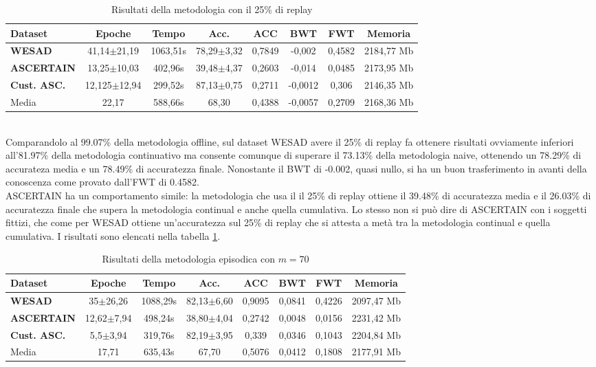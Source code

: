 \begin{table}[h]
\footnotesize
    \begin{tabular}{l|c|c|c|c|c|c|c}
        \textbf{Dataset} & \textbf{Epoche} & \textbf{Tempo} & \textbf{Acc.} & \textbf{ACC} & \textbf{BWT} & \textbf{FWT} & \textbf{Memoria}\\
        \hline
        \textbf{WESAD} & 41,14$\pm$21,19 & 1063,51s & 78,29$\pm$3,32 & 0,7849 & -0,002 & 0,4582 & 2184,77 Mb\\
        \textbf{ASCERTAIN} & 13,25$\pm$10,03 & 402,96s & 39,48$\pm$4,37 & 0,2603 & -0,014 & 0,0485 & 2173,95 Mb\\
        \textbf{Cust. ASC.} & 12,125$\pm$12,94 & 299,52s & 87,13$\pm$0,75 & 0,2711 & -0,0012 & 0,306 & 2146,35 Mb\\
        \hline
        Media & 22,17 & 588,66s & 68,30 & 0,4388 & -0,0057 & 0,2709 & 2168,36 Mb
    \end{tabular}
    \caption{Risultati della metodologia con il 25\% di replay}
    \label{tab:resreplay}
\end{table}\\
Comparandolo al 99.07\% della metodologia offline, sul dataset WESAD avere il 25\% di replay fa ottenere risultati ovviamente inferiori all'81.97\% della metodologia continuativo ma consente comunque di superare il 73.13\% della metodologia naive, ottenendo un 78.29\% di accurateza media e un 78.49\% di accuratezza finale. Nonostante il BWT di -0.002, quasi nullo, si ha un buon trasferimento in avanti della conoscenza come provato dall'FWT di 0.4582.\\
ASCERTAIN ha un comportamento simile: la metodologia che usa il il 25\% di replay ottiene il 39.48\% di accuratezza media e il 26.03\% di accuratezza finale che supera la metodologia continual e anche quella cumulativa. Lo stesso non si può dire di ASCERTAIN con i soggetti fittizi, che come per WESAD ottiene un'accuratezza sul 25\% di replay che si attesta a metà tra la metodologia continual e quella cumulativa. I risultati sono elencati nella tabella \ref{tab:resreplay}.
\begin{table}[h]
\footnotesize
    \begin{tabular}{l|c|c|c|c|c|c|c}
        \textbf{Dataset} & \textbf{Epoche} & \textbf{Tempo} & \textbf{Acc.} & \textbf{ACC} & \textbf{BWT} & \textbf{FWT} & \textbf{Memoria}\\
        \hline
        \textbf{WESAD} & 35$\pm$26,26 & 1088,29s & 82,13$\pm$6,60 & 0,9095 & 0,0841 & 0,4226 & 2097,47 Mb\\
        \textbf{ASCERTAIN} & 12,62$\pm$7,94 & 498,24s & 38,80$\pm$4,04 & 0,2742 & 0,0048 & 0,0156 & 2231,42 Mb\\
        \textbf{Cust. ASC.} & 5,5$\pm$3,94 & 319,76s & 82,19$\pm$3,95 & 0,339 & 0,0346 & 0,1043 & 2204,84 Mb\\
        \hline
        Media & 17,71 & 635,43s & 67,70 & 0,5076 & 0,0412 & 0,1808 & 2177,91 Mb
    \end{tabular}
    \caption{Risultati della metodologia episodica con $m = 70$}
    \label{tab:resepisodic}
\end{table}\\
